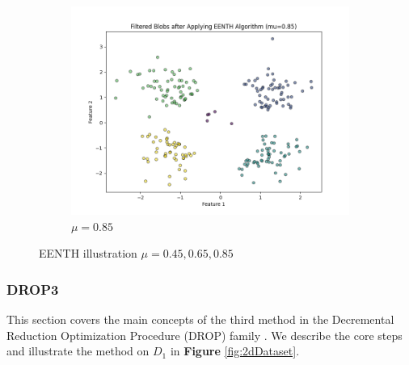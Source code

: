 \begin{figure}[ht]
\begin{subfigure}[b]{0.3\textwidth}
		\includegraphics[width=\textwidth]{figures/eenth/filtered_blobs_mu_0.85} %
		\caption{$\mu = 0.85$}
		\label{fig:85}
	\end{subfigure}
	\caption{EENTH illustration $\mu=0.45,0.65,0.85$}
	\label{fig:mu_variation_2}
\end{figure}

	

\subsubsection{DROP3}
This section covers the main concepts of the third method in the Decremental Reduction Optimization Procedure (DROP) family \cite{wilson2000reduction}. We describe the core steps and illustrate the method on $D_1$ in \textbf{Figure} \ref{fig:2dDataset}.

